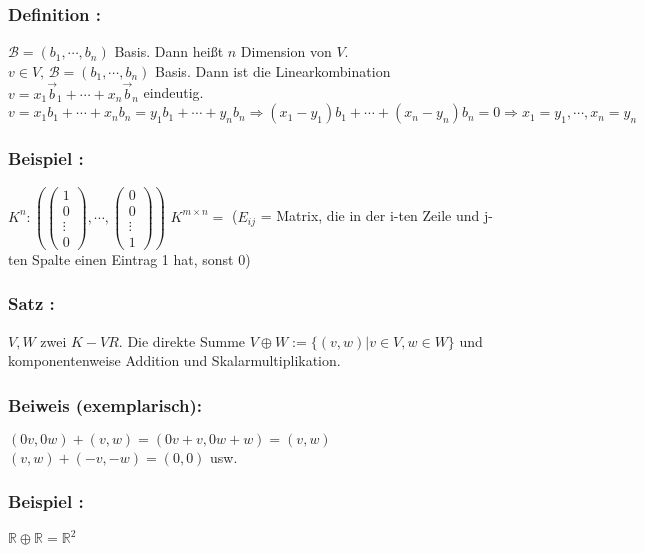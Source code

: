 \subsubsection{Definition :}
$\mathcal{B} = (b_{1},\cdots,b_{n})$ Basis. Dann heißt $n$ Dimension von $V$. \\
$v \in V, \, \mathcal{B}=(b_{1},\cdots,b_{n})$ Basis. Dann ist die Linearkombination $v=x_{1}\vec{b}_{1}+\cdots+x_{n}\vec{b}_{n}$ eindeutig.\\
$v=x_{1}b_{1}+\cdots+x_{n}b_{n}=y_{1}b_{1}+\cdots+y_{n}b_{n} \Rightarrow (x_{1}-y_{1})b_{1}+\cdots+(x_{n}-y_{n})b_{n}=0 \Rightarrow x_{1} = y_{1}, \cdots, x_{n}=y_{n}$ 
%
%
%
\subsubsection{Beispiel :}
$K^{n}:(
\begin{pmatrix} 1\\ 0\\ \vdots\\ 0 \end{pmatrix},\cdots,\begin{pmatrix} 0 \\ 0 \\ \vdots \\ 1 \end{pmatrix})$ $K^{m\times n} =$ ($E_{ij}$ = Matrix, die in der i-ten Zeile und j-ten Spalte einen Eintrag 1 hat, sonst 0)
%
%
%
\subsubsection{Satz :}
$V,W$ zwei $K-VR$. Die direkte Summe $V\oplus W:=\{(v,w)|v\in V,w\in W\}$ und komponentenweise Addition und Skalarmultiplikation. 
%
%
%
\subsubsection{Beiweis (exemplarisch):}
$(0v,0w)+(v,w)=(0v+v,0w+w)=(v,w)$\\
$(v,w)+(-v,-w)=(0,0)$ usw. 
%
%
%
\subsubsection{Beispiel :}
$\mathbb{R} \oplus \mathbb{R} = \mathbb{R}^{2}$